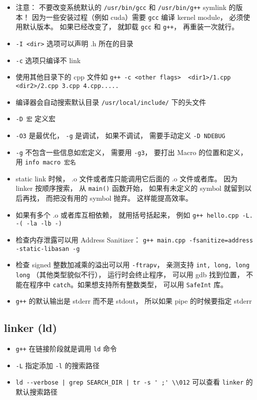 
\begin{issues}
\issueDraft
\end{issues}


\begin{itemize}
\item 注意： 不要改变系统默认的 \verb|/usr/bin/gcc| 和 \verb|/usr/bin/g++| symlink 的版本！ 因为一些安装过程（例如 cuda）需要 \verb|gcc| 编译 kernel module， 必须使用默认版本。 如果已经改变了， 就卸载 \verb|gcc| 和 \verb|g++|， 再重装一次就行。
\item \verb|-I <dir>| 选项可以声明 .h 所在的目录
\item \verb|-c| 选项只编译不 link
\item 使用其他目录下的 cpp 文件如 \verb|g++ -c <other flags>  <dir1>/1.cpp <dir2>/2.cpp 3.cpp 4.cpp.....|
\item 编译器会自动搜索默认目录 \verb|/usr/local/include/| 下的头文件
\item \verb|-D 宏| 定义宏
\item \verb|-O3| 是最优化， \verb|-g| 是调试， 如果不调试， 需要手动定义 \verb|-D NDEBUG|
\item \verb|-g| 不包含一些信息如宏定义， 需要用 \verb|-g3|， 要打出 Macro 的位置和定义， 用 \verb|info macro 宏名|
\item static link 时候， .o 文件或者库只能调用它后面的 .o 文件或者库。 因为 linker 按顺序搜索， 从 \verb|main()| 函数开始， 如果有未定义的 symbol 就留到以后再找， 而把没有用的 symbol 抛弃。 这样能提高效率。
\item 如果有多个 .o 或者库互相依赖， 就用括号括起来， 例如 \verb|g++ hello.cpp -L. -( -la -lb -)|
\item 检查内存泄露可以用 Address Sanitizer： \verb|g++ main.cpp -fsanitize=address -static-libasan -g|
\item 检查 signed 整数加减乘的溢出可以用 \verb|-ftrapv|， 亲测支持 \verb|int, long, long long| （其他类型貌似不行）， 运行时会终止程序， 可以用 gdb 找到位置， 不能在程序中 \verb|catch|。如果想支持所有整数类型， 可以用 \verb|SafeInt| 库。
\item \verb|g++| 的默认输出是 stderr 而不是 stdout， 所以如果 pipe 的时候要指定 stderr
\end{itemize}

\subsection{linker (ld)}
\begin{itemize}
\item \verb|g++| 在链接阶段就是调用 \verb|ld| 命令
\item \verb|-L| 指定添加 \verb|-l| 的搜索路径
\item \verb`ld --verbose | grep SEARCH_DIR | tr -s ' ;' \\012` 可以查看 \verb|linker| 的默认搜索路径
\end{itemize}

